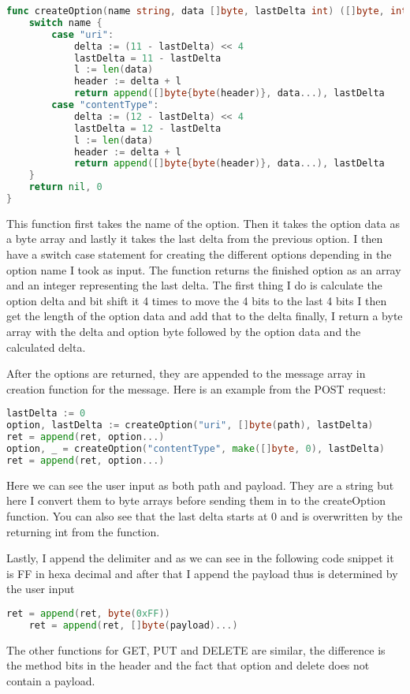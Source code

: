 \documentclass{article}
\begin{document}
\begin{lstlisting}[language=go]
func createOption(name string, data []byte, lastDelta int) ([]byte, int) {
    switch name {
	    case "uri":
		    delta := (11 - lastDelta) << 4
		    lastDelta = 11 - lastDelta
		    l := len(data)
		    header := delta + l
		    return append([]byte{byte(header)}, data...), lastDelta
	    case "contentType":
		    delta := (12 - lastDelta) << 4
		    lastDelta = 12 - lastDelta
		    l := len(data)
		    header := delta + l
		    return append([]byte{byte(header)}, data...), lastDelta
	}
	return nil, 0
}
\end{lstlisting}
This function first takes the name of the option. Then it takes the option data as a byte array
and lastly it takes the last delta from the previous option. I then have a switch case statement
for creating the different options depending in the option name I took as input.
The function returns the finished option as an array and an integer representing the last delta.
The first thing I do is calculate the option delta and bit shift it 4 times to move the 4 bits to the last 4 bits
I then get the length of the option data and add that to the delta
finally, I return a byte array with the delta and option byte followed by the option data and the calculated delta.

After the options are returned, they are appended to the message array in creation function
for the message. Here is an example from the POST request:
\begin{lstlisting}[language=go]
lastDelta := 0
option, lastDelta := createOption("uri", []byte(path), lastDelta)
ret = append(ret, option...)
option, _ = createOption("contentType", make([]byte, 0), lastDelta)
ret = append(ret, option...)
\end{lstlisting}
Here we can see the user input as both path and payload. They are a string but here I convert
them to byte arrays before sending them in to the createOption function. You can also see
that the last delta starts at 0 and is overwritten by the returning int from the function.

Lastly, I append the delimiter and as we can see in the following code snippet it is FF in
hexa decimal and after that I append the payload thus is determined by the user input
\begin{lstlisting}[language=go]
    ret = append(ret, byte(0xFF))
	ret = append(ret, []byte(payload)...)
\end{lstlisting}
The other functions for GET, PUT and DELETE are similar, the difference is the method bits in the header
and the fact that option and delete does not contain a payload.
\end{document}
